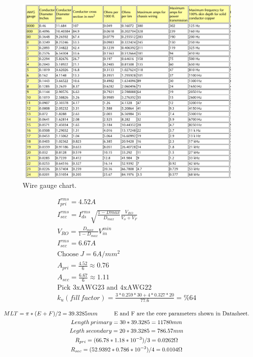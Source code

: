 \documentclass{article}
\newcommand\tab[1][1cm]{\hspace*{#1}}
\begin{document}
 \begin{figure}[H]
     \centering
     \includegraphics[scale=0.3]{kablo.png}
     \caption{Wire gauge chart.}
     \label{fig:my_label}
 \end{figure}
 \begin{gather*}
     I_{pri}^{rms}=4.52 A\\
     I_{sec}^{rms}=I_{ds}^{rms}\sqrt{\frac{1-D{max}}{D_{max}}}\frac{V_{RO}}{V_o+V_F}\\
     V_{RO}=\frac{D_{max}}{1-D_{max}}V_{in}^{min}\\
      I_{sec}^{rms}=6.67A\\
      \text{Choose} \: J=6 A/mm^2\\
      A_{pri}=\frac{4.52}{6}\approx0.76\\
      A_{sec}=\frac{6.67}{6}\approx1.11\\
      \text{Pick 3xAWG23 and 4xAWG22}\\
      k_u(fill \, factor)=\frac{3*0.259*30+4*0.327*20}{77.6}=\%64
 \end{gather*}

\begin{gather*}
    MLT=\pi *(E+F)/2=39.3285mm \tab \text{E and F are the core parameters shown in Datasheet.}\\
Length \:primary= 30*39.3285=11780 mm\\
Legth \: secondary= 20*39.3285=786.57mm\\
R_{pri}=(66.78*1.18*10^{-3})/3=0.0262 \Omega\\
R_{sec}=(52.9392*0.786*10^{-3})/4=0.0104\Omega
\end{gather*}
\end{document}
